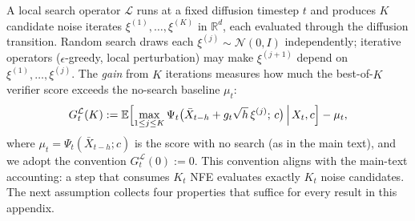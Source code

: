 A local search operator $\mathcal{L}$ runs at a fixed diffusion timestep $t$ and produces $K$ candidate noise iterates $\xi^{(1)}, \ldots, \xi^{(K)}$ in $\mathbb{R}^d$, each evaluated through the diffusion transition. Random search draws each $\xi^{(j)} \sim \mathcal{N}(0, I)$ independently; iterative operators ($\epsilon$-greedy, local perturbation) may make $\xi^{(j+1)}$ depend on $\xi^{(1)},\ldots,\xi^{(j)}$. The \emph{gain} from $K$ iterations measures how much the best-of-$K$ verifier score exceeds the no-search baseline $\mu_t$:
\begin{equation}
  G_t^{\mathcal{L}}(K) := \mathbb{E}\Bigl[\max_{1 \le j \le K} \Psi_t\bigl(\bar{X}_{t-h} + g_t\sqrt{h}\,\xi^{(j)};\,c\bigr)\,\Big|\,X_t,c\Bigr] - \mu_t,
  \label{eq:gain-general-app}
\end{equation}
where $\mu_t = \Psi_t(\bar{X}_{t-h}; c)$ is the score with no search (as in the main text), and we adopt the convention $G_t^{\mathcal{L}}(0) := 0$. This convention aligns with the main-text accounting: a step that consumes $K_t$ NFE evaluates exactly $K_t$ noise candidates. The next assumption collects four properties that suffice for every result in this appendix.
%

